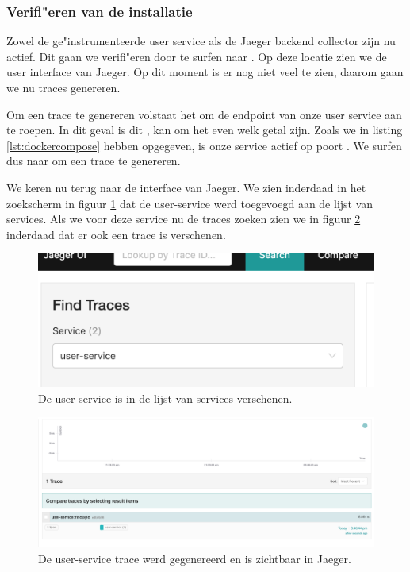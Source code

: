\subsubsection{Verifi"eren van de installatie}
Zowel de ge"instrumenteerde user service als de Jaeger backend collector zijn nu actief. Dit gaan we verifi"eren door te surfen naar . Op deze locatie zien we de user interface van Jaeger. Op dit moment is er nog niet veel te zien, daarom gaan we nu traces genereren.

Om een trace te genereren volstaat het om de endpoint van onze user service aan te roepen. In dit geval is dit ,  kan om het even welk getal zijn. Zoals we in listing \ref{lst:dockercompose} hebben opgegeven, is onze service actief op poort . We surfen dus naar  om een trace te genereren.

We keren nu terug naar de interface van Jaeger. We zien inderdaad in het zoekscherm in figuur \ref{fig:user-service} dat de user-service werd toegevoegd aan de lijst van services. Als we voor deze service nu de traces zoeken zien we in figuur \ref{fig:user-service-trace} inderdaad dat er ook een trace is verschenen.

\begin{figure}
	\includegraphics[width=\linewidth]{img/user-service.png}
	\caption{De user-service is in de lijst van services verschenen.}
	\label{fig:user-service}
\end{figure}
\begin{figure}
	\includegraphics[width=\linewidth]{img/user-service-trace.png}
	\caption{De user-service trace werd gegenereerd en is zichtbaar in Jaeger.}
	\label{fig:user-service-trace}
\end{figure}

